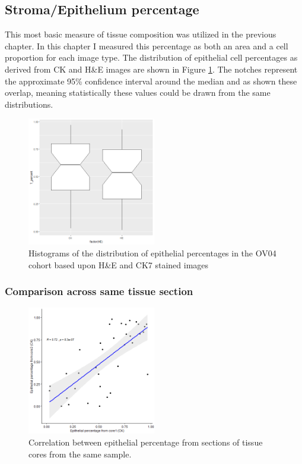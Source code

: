 \subsection{Stroma/Epithelium percentage}

This most basic measure of tissue composition was utilized in the previous chapter. In this chapter I measured this percentage as both an area and a cell proportion for each image type. The distribution of epithelial cell percentages as derived from CK and H\&E images are shown in Figure \ref{fig:epi_percent}. The notches represent the approximate 95\% confidence interval around the median and as shown these overlap, meaning statistically these values could be drawn from the same distributions. 

\begin{figure}
    \centering
    \includegraphics[width=0.5\textwidth]{Chapter3/Figs/boxplot_epithelium.png}
    \caption{Histograms of the distribution of epithelial percentages in the OV04 cohort based upon H\&E and CK7 stained images}
    \label{fig:epi_percent}
\end{figure}

\subsubsection{Comparison across same tissue section}


\begin{figure}
    \centering
    \includegraphics[width=0.5\textwidth]{Chapter3/Figs/correlation_T_CK1_Ck2.png}
    \caption{Correlation between epithelial percentage from sections of tissue cores from the same sample.}
    \label{fig:epi_percent_2slides}
\end{figure}


